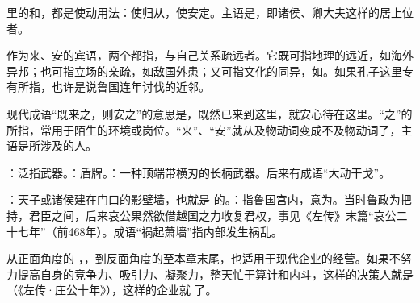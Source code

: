 {\begin{lyblobitemize}
\item {}里的和，都是使动用法：使归从，使安定。主语是，即诸侯、卿大夫这样的居上位者。

作为来、安的宾语，两个都指，与自己关系疏远者。它既可指地理的远近，如海外异邦；也可指立场的亲疏，如敌国外患；又可指文化的同异，如。如果孔子这里专有所指，也许是说鲁国连年讨伐的近邻。

现代成语“既来之，则安之”的意思是，既然已来到这里，就安心待在这里。“之”的所指，常用于陌生的环境或岗位。“来”、“安”就从及物动词变成不及物动词了，主语是所涉及的人。

\item {}：泛指武器。：盾牌。：一种顶端带横刃的长柄武器。后来有成语“大动干戈”。

\item {}：天子或诸侯建在门口的影壁墙，也就是  的。：指鲁国宫内，意为。当时鲁政为把持，君臣之间，后来哀公果然欲借越国之力收复君权，事见《左传》末篇“哀公二十七年”（前468年）。成语“祸起萧墙”指内部发生祸乱。
\end{lyblobitemize}
从正面角度的  ，，到反面角度的至本章末尾，也适用于现代企业的经营。如果不努力提高自身的竞争力、吸引力、凝聚力，整天忙于算计和内斗，这样的决策人就是（《左传·庄公十年》），这样的企业就  了。
}
{}


